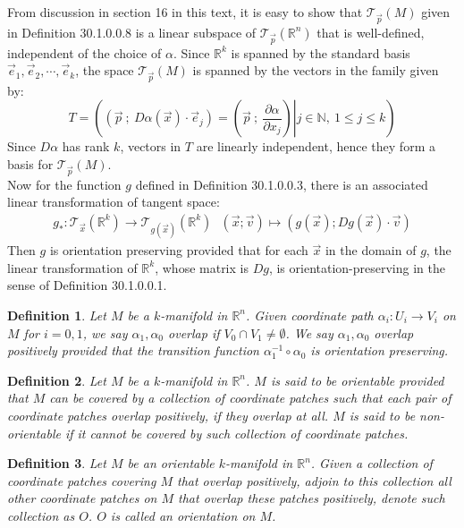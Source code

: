 \documentclass[11pt,oneside]{book}
\theoremstyle{break}
\theoremstyle{break}
\newtheorem{defn}{Definition}[corL]
\newcommand{\R}{\mathbb{R}}
\newcommand{\N}{\mathbb{N}}
\newcommand{\T}{\mathcal{T}}
\begin{document}
From discussion in section 16 in this text, it is easy to show that $\T_{\vec{p}}(M)$ given in Definition 30.1.0.0.8 is a linear subspace of $\T_{\vec{p}}(\R^n)$ that is well-defined, independent of the choice of $\alpha$. Since $\R^k$ is spanned by the standard basis $\vec{e}_1,\vec{e}_2,\cdots, \vec{e}_k$, the space $\T_{\vec{p}}(M)$ is spanned by the vectors in the family given by:
$$T = \left((\vec{p}\ ;\ D\alpha(\vec{x})\cdot \vec{e}_j ) = \left.\left(\vec{p}\ ;\ \frac{\partial \alpha}{\partial x_j }\right) \right| j \in \N , \ 1\leq j \leq k\right) $$
Since $D\alpha$ has rank $k$, vectors in $T$ are linearly independent, hence they form a basis for $\T_{\vec{p}}(M)$. \\

Now for the function $g $ defined in Definition 30.1.0.0.3, there is an associated linear transformation of tangent space:
\begin{align*}
g_*: \T_{\vec{x}}(\R^k) \to \T_{g(\vec{x})}(\R^k) \ \ \ (\vec{x};\vec{v}) \mapsto (g(\vec{x}) ; Dg(\vec{x}) \cdot \vec{v})
\end{align*}
Then $g$ is orientation preserving provided that for each $\vec{x}$ in the domain of $g$, the linear transformation of $\R^k$, whose matrix is $Dg$, is orientation-preserving in the sense of Definition 30.1.0.0.1.\\

\begin{defn}
Let $M$ be a $k$-manifold in $\R^n$. Given coordinate path $\alpha_i:U_i \to V_i$ on $M$ for $i = 0,1$, we say $\alpha_1,\alpha_0$ overlap if $V_0 \cap V_1 \neq \emptyset$. We say $\alpha_1,\alpha_0$ overlap positively provided that the transition function $\alpha_1^{-1} \circ \alpha_0$ is orientation preserving.
\end{defn}

\begin{defn}
Let $M$ be a $k$-manifold in $\R^n$. $M$ is said to be orientable provided that $M$ can be covered by a collection of coordinate patches such that each pair of coordinate patches overlap positively, if they overlap at all. $M$ is said to be non-orientable if it cannot be covered by such collection of coordinate patches. 
\end{defn}

\begin{defn}
Let $M$ be an orientable $k$-manifold in $\R^n$. Given a collection of coordinate patches covering $M$ that overlap positively, adjoin to this collection all other coordinate patches on $M$ that overlap these patches positively, denote such collection as $O$. $O$ is called an orientation on $M$. 
\end{defn}
\end{document}

